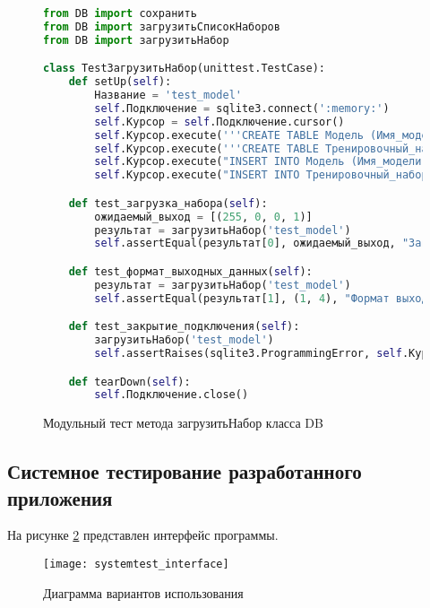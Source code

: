 \begin{figure}[H]
\begin{lstlisting}[language=Python]
from DB import сохранить
from DB import загрузитьСписокНаборов
from DB import загрузитьНабор

class TestЗагрузитьНабор(unittest.TestCase):
    def setUp(self):
        Название = 'test_model'
        self.Подключение = sqlite3.connect(':memory:')
        self.Курсор = self.Подключение.cursor()
        self.Курсор.execute('''CREATE TABLE Модель (Имя_модели TEXT, ИД_Тренировочного_набора INTEGER)''')
        self.Курсор.execute('''CREATE TABLE Тренировочный_набор (ИД_тренировочного_набора INTEGER, Красный_канал INTEGER, Синий_канал INTEGER, Зелёный_канал INTEGER, Выходные_данные INTEGER)''')
        self.Курсор.execute("INSERT INTO Модель (Имя_модели, ИД_Тренировочного_набора) VALUES (?, ?)", (Название, 1))
        self.Курсор.execute("INSERT INTO Тренировочный_набор (ИД_тренировочного_набора, Красный_канал, Синий_канал, Зелёный_канал, Выходные_данные) VALUES (1, 255, 0, 0, 1)")

    def test_загрузка_набора(self):
        ожидаемый_выход = [(255, 0, 0, 1)]
        результат = загрузитьНабор('test_model')
        self.assertEqual(результат[0], ожидаемый_выход, "Загруженный набор должен соответствовать ожидаемому")

    def test_формат_выходных_данных(self):
        результат = загрузитьНабор('test_model')
        self.assertEqual(результат[1], (1, 4), "Формат выходных данных должен быть кортежем с размерностью набора")

    def test_закрытие_подключения(self):
        загрузитьНабор('test_model')
        self.assertRaises(sqlite3.ProgrammingError, self.Курсор.execute, "SELECT * FROM Модель")

    def tearDown(self):
        self.Подключение.close()
\end{lstlisting}  
\caption{Модульный тест метода загрузитьНабор класса DB}
\label{test6:image}
\end{figure}
\subsection{Системное тестирование разработанного приложения}

На рисунке \ref{systemtest_interface:image} представлен интерфейс программы.
\begin{figure}[H]
\centering
\texttt{[image: systemtest\_interface]}
\caption{Диаграмма вариантов использования}
\label{systemtest_interface:image}
\end{figure}

